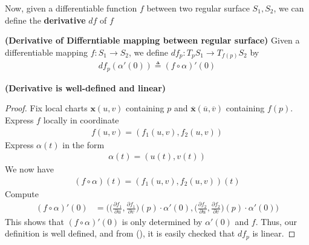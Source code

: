 \documentclass{report}
\begin{document}
\begin{mdframed}
Now, given a differentiable function $f$ between two regular surface $S_1,S_2$, we can define the \textbf{derivative} $df$ of $f$ 
\end{mdframed}
\begin{definition}
\textbf{(Derivative of Differntiable mapping between regular surface)} Given a differentiable mapping $f:S_1\rightarrow S_2$, we define $df_p:T_pS_1\to T_{f(p)}S_2$ by 
\begin{align*}
df_p(\alpha '(0))\triangleq (f\circ \alpha )'(0)
\end{align*}
\end{definition}
\begin{theorem}
\textbf{(Derivative is well-defined and linear)}
\end{theorem}
\begin{proof}
Fix local charts $\textbf{x}(u,v)$ containing $p$ and $\overline{\textbf{x}}(\overline{u},\overline{v})$ containing $f(p)$. Express $f$ locally in coordinate 
\begin{align*}
f(u,v)=(f_1(u,v),f_2(u,v))
\end{align*}
Express $\alpha(t)$ in the form 
\begin{align*}
\alpha (t)=(u(t),v(t))
\end{align*}
We now have 
\begin{align*}
  (f\circ \alpha )(t)=(f_1(u,v),f_2(u,v))(t)
\end{align*}
Compute 
\begin{align}
\label{falpha}
  (f\circ \alpha )'(0)&=\Big(\big(\frac{\partial f_1}{\partial u},\frac{\partial f_1}{\partial v} \big)(p)\cdot \alpha '(0),\big(\frac{\partial f_2}{\partial u},\frac{\partial f_2}{\partial v} \big)(p)\cdot \alpha '(0)  \Big)
\end{align}
This shows that $(f\circ \alpha )'(0)$ is only determined by $\alpha '(0)$ and $f$. Thus, our definition is well defined, and from (), it is easily checked that $df_p$ is linear.  
\end{proof}
\end{document}
